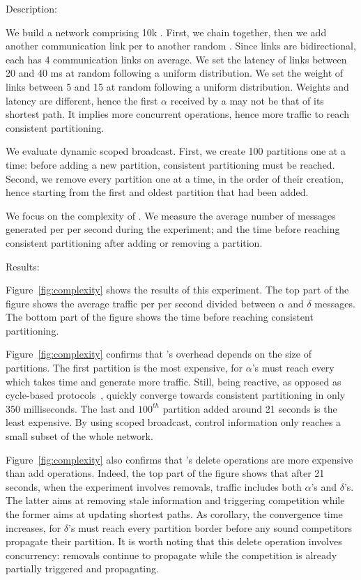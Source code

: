 \begin{asparadesc}
\item [Description:]

We build a network comprising 10k \processes. First, we chain
\processes together, then we add another communication link per
\process to another random \process. Since links are bidirectional,
each \process has 4 communication links on average. We set the latency
of links between 20 and 40 ms at random following a uniform
distribution. We set the weight of links between 5 and 15 at random
following a uniform distribution. Weights and latency are different,
hence the first $\alpha$ received by a \process may not be that of its
shortest path. It implies more concurrent operations, hence more
traffic to reach consistent partitioning.

\noindent We evaluate dynamic scoped broadcast. First, we create 100
partitions one at a time: before adding a new partition, consistent
partitioning must be reached. Second, we remove every partition one at
a time, in the order of their creation, hence starting from the first
and oldest partition that had been added.

\noindent We focus on the complexity of \NAME. We measure the average
number of messages generated per \process per second during the
experiment; and the time before reaching consistent partitioning after
adding or removing a partition.

\item [Results:]

Figure~\ref{fig:complexity} shows the results of this experiment. The
top part of the figure shows the average traffic per \process per
second divided between $\alpha$ and $\delta$ messages. The bottom part
of the figure shows the time before reaching consistent partitioning.

\noindent Figure~\ref{fig:complexity} confirms that \NAME's overhead
depends on the size of partitions. The first partition is the most
expensive, for $\alpha$'s must reach every \process which takes time
and generate more traffic. Still, being reactive, as opposed as
cycle-based protocols~\cite{jelasity2007gossip}, \NAME quickly
converge towards consistent partitioning in only 350 milliseconds. The
last and $100^{th}$ partition added around 21 seconds is the least
expensive. By using scoped broadcast, control information only reaches
a small subset of the whole network.

\noindent Figure~\ref{fig:complexity} also confirms that \NAME's
delete operations are more expensive than add operations. Indeed, the
top part of the figure shows that after 21 seconds, when the
experiment involves removals, traffic includes both $\alpha$'s and
$\delta$'s. The latter aims at removing stale information and
triggering competition while the former aims at updating shortest
paths. As corollary, the convergence time increases, for $\delta$'s
must reach every partition border before any sound competitors
propagate their partition. It is worth noting that this delete
operation involves concurrency: removals continue to propagate while
the competition is already partially triggered and propagating.


\end{asparadesc}
